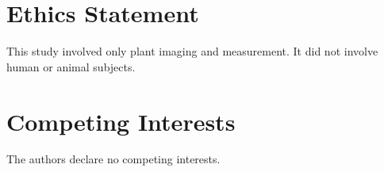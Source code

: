 \documentclass[a4paper]{cas-sc}
\begin{document}
\section*{Ethics Statement}

This study involved only plant imaging and measurement. It did not involve human or animal subjects.

\section*{Competing Interests}

The authors declare no competing interests.



\end{document}
